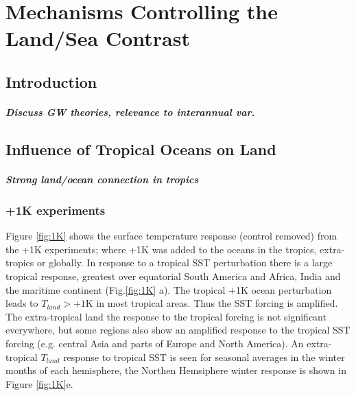 \chapter{Mechanisms Controlling the Land/Sea Contrast} 

\label{mechanisms} 


\section{Introduction}
\paragraph{Discuss GW theories, relevance to interannual var.}


\section{Influence of Tropical Oceans on Land}

\paragraph{Strong land/ocean connection in tropics}

\subsection{+1K experiments}

Figure \ref{fig:1K} shows the surface temperature response (control removed) 
from the +1K experiments; where +1K was added to the oceans in the tropics, 
extra-tropics or globally. In response to a tropical SST perturbation there is a 
large tropical response, greatest over equatorial South America and Africa, 
India and the maritime continent (Fig.\ref{fig:1K} a). The tropical +1K ocean 
perturbation leads to $T_{land}>+1$K in most tropical areas. Thus the SST 
forcing is amplified. The extra-tropical land the response to the tropical 
forcing is not significant everywhere, but some regions also show an amplified 
response to the tropical SST forcing (e.g. central Asia and parts of Europe and 
North America).  An extra-tropical $T_{land}$ response to tropical SST is seen 
for seasonal averages in the winter months of each hemisphere, the Northen 
Hemsiphere winter response is shown in Figure \ref{fig:1K}e.

